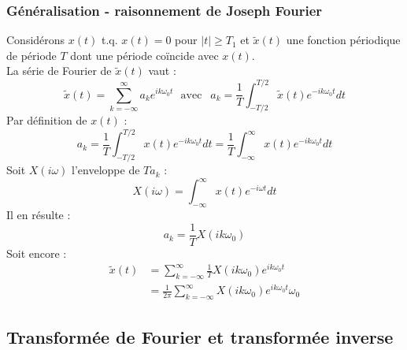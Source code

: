 \subsubsection{Généralisation - raisonnement de Joseph Fourier}
Considérons $x(t)$ t.q. $x(t) =0$ pour $|t|\geq T_1$ et $\tilde{
x}(t)$ une fonction périodique de période $T$ dont une période 
coïncide avec $x(t)$.\\
La série de Fourier de $\tilde{x}(t)$ vaut : 
\begin{equation}
	\tilde{x}(t) = \sum_{k=-\infty}^\infty a_ke^{ik\omega_0t}\ \ \
	\text{avec }\ \ a_k = \frac{1}{T}\int_{-T/2}^{T/2} \tilde{x}(t)
	e^{-ik\omega_0t}dt
\end{equation}
Par définition de $x(t)$ :
\begin{equation}
	a_k  = \frac{1}{T}\int_{-T/2}^{T/2} x(t)e^{-ik\omega_0t}dt = \frac{1}
	{T}\int_{-\infty}^\infty x(t)e^{-ik\omega_0t}dt
\end{equation}
Soit $X(i\omega)$ l'enveloppe de $Ta_k$ :
\begin{equation}
	X(i\omega) = \int_{-\infty}^\infty x(t)e^{-i\omega t}dt
\end{equation}
Il en résulte :
\begin{equation}
	a_k = \frac{1}{T}X(ik\omega_0)
\end{equation}
Soit encore : 
\begin{equation}
	\begin{array}{ll}
		\tilde{x}(t) & = \sum_{k=-\infty}^\infty \frac{1}{T}X(ik\omega_0)e^       
		{ik\omega_0t}\\
		             & = \frac{1}{2\pi}\sum_{k=-\infty}^\infty X(ik\omega_0)e^{ik 
		\omega_0t}\omega_0
	\end{array}
	\label{eq:ObtFourier}
\end{equation}
		
		
\subsection{Transformée de Fourier et transformée inverse}
\ \\
	


